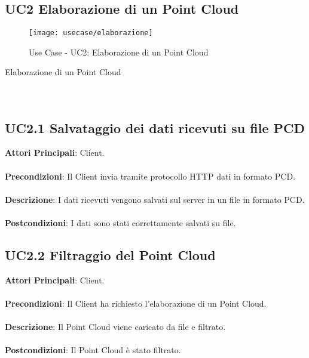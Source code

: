 \subsection{UC2 Elaborazione di un Point Cloud}
\begin{figure}[!h] 
    \centering 
    \texttt{[image: usecase/elaborazione]} 
    \caption{Use Case - UC2: Elaborazione di un Point Cloud}
\end{figure}

\begin{usecase}{2}{Elaborazione di un Point Cloud}
\\ 
\\ 
\\ 
\label{uc:elaborazione}
\end{usecase}

\subsection{UC2.1 Salvataggio dei dati ricevuti su file PCD}
\textbf{Attori Principali}: Client.
\\\\ \textbf{Precondizioni}: Il Client invia tramite protocollo HTTP dati in formato PCD.
\\\\ \textbf{Descrizione}: I dati ricevuti vengono salvati sul server in un file in formato PCD.
\\\\ \textbf{Postcondizioni}: I dati sono stati correttamente salvati su file.

\subsection{UC2.2 Filtraggio del Point Cloud}
\textbf{Attori Principali}: Client.
\\\\ \textbf{Precondizioni}: Il Client ha richiesto l'elaborazione di un Point Cloud.
\\\\ \textbf{Descrizione}: Il Point Cloud viene caricato da file e filtrato.
\\\\ \textbf{Postcondizioni}: Il Point Cloud è stato filtrato.

